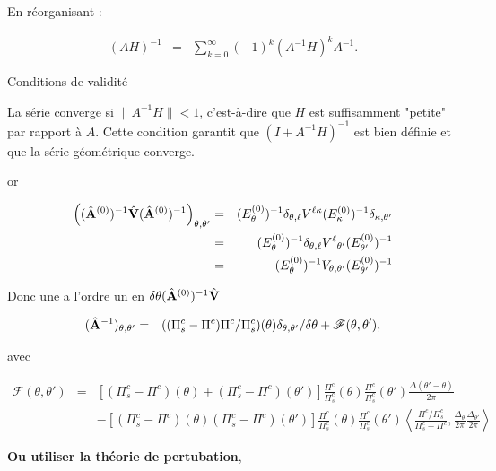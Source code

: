 {{En réorganisant :

\begin{eqnarray*}
	(A H)^{-1} &= &\sum_{k=0}^\infty (-1)^k (A^{-1} H)^k A^{-1}.
\end{eqnarray*}


Conditions de validité

La série converge si \( \| A^{-1} H \| < 1 \), c’est-à-dire que \( H \) est suffisamment "petite" par rapport à \( A \).  
Cette condition garantit que \( (I + A^{-1} H)^{-1} \) est bien définie et que la série géométrique converge.}
}

or 

\begin{eqnarray*}
	\left ( (\hat{\mathbf{A}}^{(0)})^{-1} \hat{\mathbf{V}}	(\hat{\mathbf{A}}^{(0)})^{-1} \right)	_{\theta,\theta'} & = & (E_\theta^{(0)})^{-1} \delta_{\theta, \ell}  V^{\ell \kappa} (E_\kappa^{(0)})^{-1} \delta_{\kappa, \theta'} \\
	& = & (E_\theta^{(0)})^{-1} \delta_{\theta, \ell} {V^{\ell }}_{\theta'} (E_{\theta'}^{(0)})^{-1}\\
	& = & (E_\theta^{(0)})^{-1}  V_{\theta , \theta'} (E_{\theta'}^{(0)})^{-1}
\end{eqnarray*}

\begin{aff}
Donc une a l'ordre un en $\delta \theta (\hat{\mathbf{A}}^{(0)})^{-1} \hat{\mathbf{V}}$ 

\begin{eqnarray*}
	(\hat{\mathbf{A}}^{-1})_{\theta,\theta'} & = &  ( (\Pi^c_s - \Pi^c)\Pi^c/\Pi^c_s ) ( \theta ) \delta_{\theta, \theta'}/\delta \theta + \mathscr{F}(\theta , \theta' ) ,	
\end{eqnarray*}

avec 

\begin{eqnarray*}
	\mathscr{F}(\theta , \theta' ) & = & \left [ (\Pi^c_s - \Pi^c )( \theta)  +  (\Pi^c_s - \Pi^c ) ( \theta' )\right ] \frac{\Pi^c}{\Pi^c_s}(\theta)\frac{\Pi^c}{\Pi^c_s}(\theta') \frac{ \Delta( \theta'- \theta )}{ 2 \pi }\\
	&&  - \left [ (\Pi^c_s - \Pi^c )( \theta)   (\Pi^c_s - \Pi^c ) ( \theta' )\right ] \frac{\Pi^c}{\Pi^c_s}(\theta)\frac{\Pi^c}{\Pi^c_s}(\theta')\left \langle  \frac{ \Pi^c/\Pi^c_s}{\Pi^c_s - \Pi^c} , \frac{\Delta_\theta}{2 \pi}\frac{\Delta_{\theta'}}{2 \pi} \right \rangle 	
\end{eqnarray*}
\end{aff}


{\bf Ou utiliser la théorie de pertubation},\\


